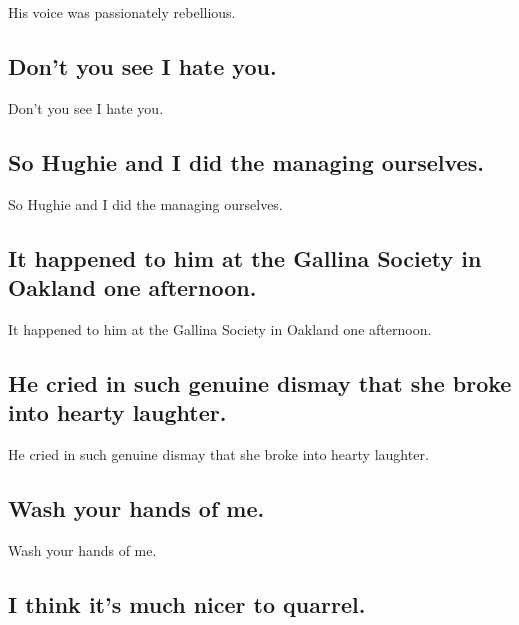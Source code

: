 \documentclass[]{article}
\begin{document}
His voice was passionately rebellious.

\hypertarget{dont-you-see-i-hate-you.}{%
\subsection{Don't you see I hate you.}\label{dont-you-see-i-hate-you.}}

Don't you see I hate you.

\hypertarget{so-hughie-and-i-did-the-managing-ourselves.}{%
\subsection{So Hughie and I did the managing
ourselves.}\label{so-hughie-and-i-did-the-managing-ourselves.}}

So Hughie and I did the managing ourselves.

\hypertarget{it-happened-to-him-at-the-gallina-society-in-oakland-one-afternoon.}{%
\subsection{It happened to him at the Gallina Society in Oakland one
afternoon.}\label{it-happened-to-him-at-the-gallina-society-in-oakland-one-afternoon.}}

It happened to him at the Gallina Society in Oakland one afternoon.

\hypertarget{he-cried-in-such-genuine-dismay-that-she-broke-into-hearty-laughter.}{%
\subsection{He cried in such genuine dismay that she broke into hearty
laughter.}\label{he-cried-in-such-genuine-dismay-that-she-broke-into-hearty-laughter.}}

He cried in such genuine dismay that she broke into hearty laughter.

\hypertarget{wash-your-hands-of-me.}{%
\subsection{Wash your hands of me.}\label{wash-your-hands-of-me.}}

Wash your hands of me.

\hypertarget{i-think-its-much-nicer-to-quarrel.}{%
\subsection{I think it's much nicer to
quarrel.}\label{i-think-its-much-nicer-to-quarrel.}}
\end{document}
